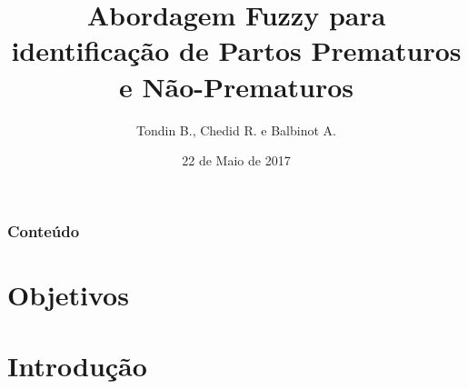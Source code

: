 \documentclass{beamer}
\title[DELET-UFRGS]{Abordagem Fuzzy para identifica\c{c}\~ao de Partos Prematuros e N\~ao-Prematuros} %
\author{Tondin B., Chedid R. e Balbinot A.} %
\institute[UFRGS] %
{
Universidade Federal do Rio Grande do Sul \\ %
\medskip
\textit{btondin@hcpa.edu.br, raissan@gmail.com} %
}
\date{ 22 de Maio de 2017} %
\begin{document}
\begin{frame}
\titlepage %
\end{frame}

\begin{frame}
\frametitle{Conte\'udo} %
\tableofcontents %
\end{frame}


\section{Objetivos} %

\section{Introdu\c{c}\~ao} 



\end{document}
